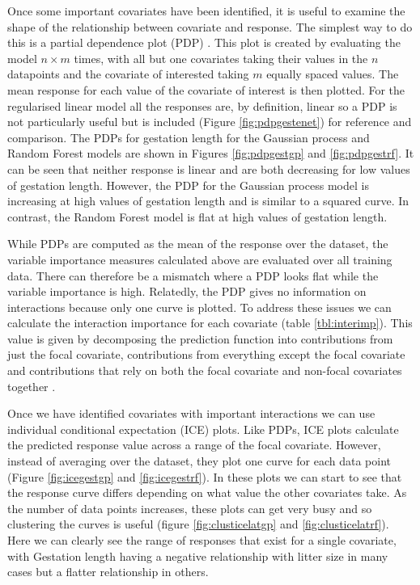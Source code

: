 \documentclass[12pt,]{article}
\begin{document}
Once some important covariates have been identified, it is useful to examine the shape of the relationship between covariate and response.
The simplest way to do this is a partial dependence plot (PDP) \citep{friedman2001greedy}.
This plot is created by evaluating the model $n \times m$ times, with all but one covariates taking their values in the $n$ datapoints  and the covariate of interested taking $m$ equally spaced values. 
The mean response for each value of the covariate of interest is then plotted.
For the regularised linear model all the responses are, by definition, linear so a PDP is not particularly useful but is included (Figure \ref{fig:pdpgestenet}) for reference and comparison.
The PDPs for gestation length for the Gaussian process and Random Forest models are shown in Figures \ref{fig:pdpgestgp} and \ref{fig:pdpgestrf}.
It can be seen that neither response is linear and are both decreasing for low values of gestation length.
However, the PDP for the Gaussian process model is increasing at high values of gestation length and is similar to a squared curve.
In contrast, the Random Forest model is flat at high values of gestation length.



While PDPs are computed as the mean of the response over the dataset, the variable importance measures calculated above are evaluated over all training data.
There can therefore be a mismatch where a PDP looks flat while the variable importance is high.
Relatedly, the PDP gives no information on interactions because only one curve is plotted.
To address these issues we can calculate the interaction importance for each covariate (table \ref{tbl:interimp}).
This value is given by decomposing the prediction function into contributions from just the focal covariate, contributions from everything except the focal covariate and contributions that rely on both the focal covariate and non-focal covariates together \citep{friedman2008predictive}.


Once we have identified covariates with important interactions we can use individual conditional expectation (ICE) plots.
Like PDPs, ICE plots calculate the predicted response value across a range of the focal covariate.
However, instead of averaging over the dataset, they plot one curve for each data point (Figure \ref{fig:icegestgp} and \ref{fig:icegestrf}).
In these plots we can start to see that the response curve differs depending on what value the other covariates take.
As the number of data points increases, these plots can get very busy and so clustering the curves is useful (figure \ref{fig:clusticelatgp} and \ref{fig:clusticelatrf}).
Here we can clearly see the range of responses that exist for a single covariate, with Gestation length having a negative relationship with litter size in many cases but a flatter relationship in others.
\end{document}
